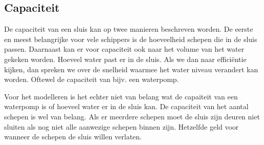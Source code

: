 \documentclass{article}
\begin{document}
\vskip0.5cm

\subsection{Capaciteit}
De capaciteit van een sluis kan op twee manieren beschreven worden. De eerste en meest belangrijke voor vele schippers is de hoeveelheid schepen die in de sluis passen.
Daarnaast kan er voor capaciteit ook naar het volume van het water gekeken worden. Hoeveel water past er in de sluis.
Als we dan naar efficiëntie kijken, dan spreken we over de snelheid waarmee het water niveau verandert kan worden. Oftewel de capaciteit van bijv. een waterpomp.

Voor het modelleren is het echter niet van belang wat de capaiteit van een waterpomp is of hoeveel water er in de sluis kan. De capaciteit van het aantal schepen is wel van belang. Als er meerdere schepen moet de sluis zijn deuren niet sluiten als nog niet alle aanwezige schepen binnen zijn. Hetzelfde geld voor wanneer de schepen de sluis willen verlaten.

\clearpage
\end{document}
